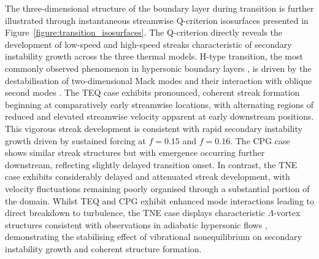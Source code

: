 
The three-dimensional structure of the boundary layer during transition is further illustrated through instantaneous streamwise Q-criterion isosurfaces presented in Figure~\ref{figure:transition_isosurfaces}. The Q-criterion directly reveals the development of low-speed and high-speed streaks characteristic of secondary instability growth across the three thermal models. H-type transition, the most commonly observed phenomenon in hypersonic boundary layers \citep{DeTullio2013}, is driven by the destabilisation of two-dimensional Mack modes \citep{Fedorov2011} and their interaction with oblique second modes \citep{Franko2013, Passiatore2021}. The \gls{TEQ} case exhibits pronounced, coherent streak formation beginning at comparatively early streamwise locations, with alternating regions of reduced and elevated streamwise velocity apparent at early downstream positions. This vigorous streak development is consistent with rapid secondary instability growth driven by sustained forcing at $f = 0.15$ and $f = 0.16$. The \gls{CPG} case shows similar streak structures but with emergence occurring further downstream, reflecting slightly delayed transition onset. In contrast, the \gls{TNE} case exhibits considerably delayed and attenuated streak development, with velocity fluctuations remaining poorly organised through a substantial portion of the domain. Whilst \gls{TEQ} and \gls{CPG} exhibit enhanced mode interactions leading to direct breakdown to turbulence, the \gls{TNE} case displays characteristic $\Lambda$-vortex structures consistent with observations in adiabatic hypersonic flows \citep{Passiatore2021}, demonstrating the stabilising effect of vibrational nonequilibrium on secondary instability growth and coherent structure formation.

